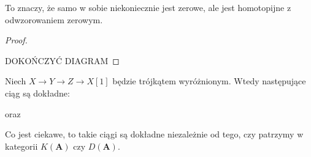 To znaczy, że samo w sobie niekoniecznie jest zerowe, ale jest homotopijne z odwzorowaniem zerowym.

\begin{proof}
  \begin{center}\end{center}

  {\large\color{red}DOKOŃCZYĆ DIAGRAM}
\end{proof}

\begin{lemma}
  Niech $X\to Y\to Z\to X[1]$ będzie trójkątem wyróżnionym. Wtedy następujące ciąg są dokładne:
  \begin{center}\end{center}
  
  oraz

  \begin{center}\end{center}
\end{lemma}

Co jest ciekawe, to takie ciągi są dokładne niezależnie od tego, czy patrzymy w kategorii $K(\mathbf{A})$ czy $D(\mathbf{A})$.

